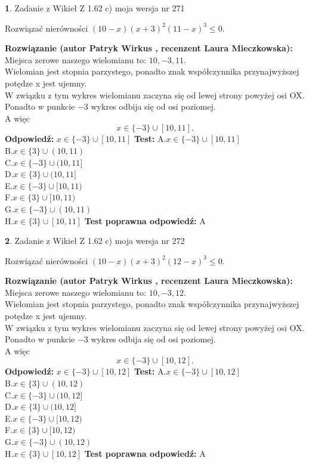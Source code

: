 \documentclass[12pt, a4paper]{article}
\theoremstyle{definition} %
\newtheorem{zad}{}
\newcommand{\zadStart}[1]{\begin{zad}#1\newline}
\newcommand{\zadStop}{\end{zad}}
\newcommand{\rozwStart}[2]{\noindent \textbf{Rozwiązanie (autor #1 , recenzent #2): }\newline}
\newcommand{\rozwStop}{\newline}
\newcommand{\odpStart}{\noindent \textbf{Odpowiedź:}\newline}
\newcommand{\odpStop}{\newline}
\newcommand{\testStart}{\noindent \textbf{Test:}\newline}
\newcommand{\testStop}{\newline}
\newcommand{\kluczStart}{\noindent \textbf{Test poprawna odpowiedź:}\newline}
\newcommand{\kluczStop}{\newline}
\begin{document}
\zadStart{Zadanie z Wikieł Z 1.62 c) moja wersja nr 271}

Rozwiązać nierówności $(10-x)(x+3)^{2}(11-x)^{3}\le0$.
\zadStop
\rozwStart{Patryk Wirkus}{Laura Mieczkowska}
Miejsca zerowe naszego wielomianu to: $10, -3, 11$.\\
Wielomian jest stopnia parzystego, ponadto znak współczynnika przy\linebreak najwyższej potędze x jest ujemny.\\ W związku z tym wykres wielomianu zaczyna się od lewej strony powyżej osi OX.\\
Ponadto w punkcie $-3$ wykres odbija się od osi poziomej.\\
A więc $$x \in \{-3\} \cup [10,11].$$
\rozwStop
\odpStart
$x \in \{-3\} \cup [10,11]$
\odpStop
\testStart
A.$x \in \{-3\} \cup [10,11]$\\
B.$x \in \{3\} \cup (10,11)$\\
C.$x \in \{-3\} \cup (10,11]$\\
D.$x \in \{3\} \cup (10,11]$\\
E.$x \in \{-3\} \cup [10,11)$\\
F.$x \in \{3\} \cup [10,11)$\\
G.$x \in \{-3\} \cup (10,11)$\\
H.$x \in \{3\} \cup [10,11]$
\testStop
\kluczStart
A
\kluczStop



\zadStart{Zadanie z Wikieł Z 1.62 c) moja wersja nr 272}

Rozwiązać nierówności $(10-x)(x+3)^{2}(12-x)^{3}\le0$.
\zadStop
\rozwStart{Patryk Wirkus}{Laura Mieczkowska}
Miejsca zerowe naszego wielomianu to: $10, -3, 12$.\\
Wielomian jest stopnia parzystego, ponadto znak współczynnika przy\linebreak najwyższej potędze x jest ujemny.\\ W związku z tym wykres wielomianu zaczyna się od lewej strony powyżej osi OX.\\
Ponadto w punkcie $-3$ wykres odbija się od osi poziomej.\\
A więc $$x \in \{-3\} \cup [10,12].$$
\rozwStop
\odpStart
$x \in \{-3\} \cup [10,12]$
\odpStop
\testStart
A.$x \in \{-3\} \cup [10,12]$\\
B.$x \in \{3\} \cup (10,12)$\\
C.$x \in \{-3\} \cup (10,12]$\\
D.$x \in \{3\} \cup (10,12]$\\
E.$x \in \{-3\} \cup [10,12)$\\
F.$x \in \{3\} \cup [10,12)$\\
G.$x \in \{-3\} \cup (10,12)$\\
H.$x \in \{3\} \cup [10,12]$
\testStop
\kluczStart
A
\kluczStop
\end{document}
